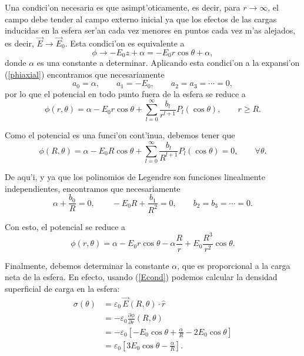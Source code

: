 Una condici'on necesaria es que asimpt'oticamente, es decir, para $r\to\infty$, el campo debe tender al campo externo inicial ya que los efectos de las cargas inducidas en la esfera ser'an cada vez menores en puntos cada vez m'as alejados, es decir, $\vec{E}\to\vec{E}_0 $. Esta condici'on es equivalente a 
\begin{equation}
\phi\to -E_0z+\alpha=-E_0r\cos\theta+\alpha,
\end{equation}
donde $\alpha$ es una constante a determinar. Aplicando esta condici'on a la expansi'on (\ref{phiaxial}) encontramos que necesariamente
\begin{equation}
a_0=\alpha, \qquad a_1=-E_0, \qquad a_2=a_3=\cdots =0,
\end{equation}
por lo que el potencial en todo punto  fuera de la esfera se reduce a 
\begin{equation}
\phi(r,\theta)=\alpha -E_0 r\cos\theta +
\sum_{l=0}^\infty\frac{b_l}{r^{l+1}}P_l(\cos\theta), \qquad r\ge R.
\end{equation}

Como el potencial es una funci'on cont'inua, debemos tener que
\begin{equation}
\phi(R,\theta)=\alpha -E_0 R\cos\theta +
\sum_{l=0}^\infty\frac{b_l}{R^{l+1}}P_l(\cos\theta)=0, \qquad \forall \theta.
\end{equation}

De aqu'i, y ya que los polinomios de Legendre son funciones linealmente independientes, encontramos que necesariamente
\begin{equation}
\alpha+\frac{b_0}{R}=0, \qquad -E_0R+\frac{b_1}{R^2}=0, \qquad b_2=b_3=\cdots =0.
\end{equation}

Con esto, el potencial se reduce a
\begin{equation}\label{phialpha}
\phi(r,\theta)=\alpha -E_0 r\cos\theta -\alpha\frac{R}{r}+E_0 \frac{R^3}{r^2}\cos\theta. 
\end{equation}

Finalmente, debemos determinar la constante $\alpha$, que es proporcional a la carga neta de la esfera. En efecto, usando (\ref{Econd}) podemos calcular la densidad superficial de carga en la esfera:
\begin{align}
\sigma(\theta) &= \varepsilon_0\, \vec{E}(R,\theta)\cdot\hat{r} \\
&= -\varepsilon_0 \frac{\partial\phi}{\partial r}(R,\theta) \\
&= -\varepsilon_0\left[-E_0\cos\theta+\frac{\alpha}{R}-2E_0\cos\theta\right]\\
&= \varepsilon_0\left[3E_0\cos\theta-\frac{\alpha}{R}\right].
\end{align}

